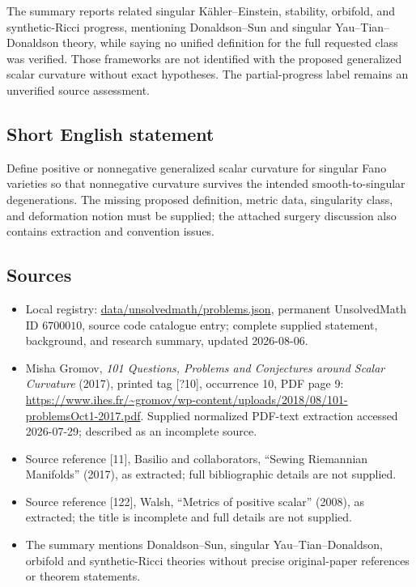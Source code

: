 \documentclass[11pt]{article}
\begin{document}
The summary reports related singular K\"ahler--Einstein, stability, orbifold, and synthetic-Ricci progress, mentioning Donaldson--Sun and singular Yau--Tian--Donaldson theory, while saying no unified definition for the full requested class was verified. Those frameworks are not identified with the proposed generalized scalar curvature without exact hypotheses. The partial-progress label remains an unverified source assessment.
\subsection{Short English statement}
Define positive or nonnegative generalized scalar curvature for singular Fano varieties so that nonnegative curvature survives the intended smooth-to-singular degenerations. The missing proposed definition, metric data, singularity class, and deformation notion must be supplied; the attached surgery discussion also contains extraction and convention issues.
\subsection{Sources}
\begin{itemize}
\item Local registry: \url{data/unsolvedmath/problems.json}, permanent UnsolvedMath ID \(6700010\), source code catalogue entry; complete supplied statement, background, and research summary, updated 2026-08-06.
\item Misha Gromov, \emph{101 Questions, Problems and Conjectures around Scalar Curvature} (2017), printed tag [?10], occurrence 10, PDF page 9: \url{https://www.ihes.fr/~gromov/wp-content/uploads/2018/08/101-problemsOct1-2017.pdf}. Supplied normalized PDF-text extraction accessed 2026-07-29; described as an incomplete source.
\item Source reference [11], Basilio and collaborators, ``Sewing Riemannian Manifolds'' (2017), as extracted; full bibliographic details are not supplied.
\item Source reference [122], Walsh, ``Metrics of positive scalar'' (2008), as extracted; the title is incomplete and full details are not supplied.
\item The summary mentions Donaldson--Sun, singular Yau--Tian--Donaldson, orbifold and synthetic-Ricci theories without precise original-paper references or theorem statements.
\end{itemize}
\end{document}
